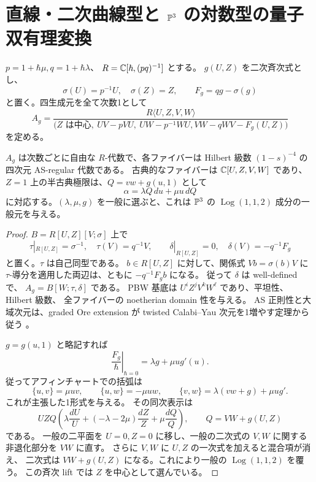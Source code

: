 \section{直線・二次曲線型と \texorpdfstring{$\mathbb P^3$}{P3} の対数型の量子双有理変換}
\label{sec:line-conic-quantum-link}\label{sec:line-conic-quantum}

$p=1+\hbar\mu,q=1+\hbar\lambda$、
$R=\mathbb C[\hbar,(pq)^{-1}]$ とする。
$g(U,Z)$ を二次斉次式とし、
\[
 \sigma(U)=p^{-1}U,\quad \sigma(Z)=Z,\qquad
 F_g=qg-\sigma(g)
\]
と置く。四生成元を全て次数1として
\begin{equation}\label{eq:ore-log112}
 A_g=\frac{R\langle U,Z,V,W\rangle}
 {\bigl(Z\text{ は中心},\ UV-pVU,\ UW-p^{-1}WU,
       VW-qWV-F_g(U,Z)\bigr)}
\end{equation}
を定める。

\begin{proposition}\label{prop:ore-log112}
$A_g$ は次数ごとに自由な $R$-代数で、各ファイバーは
Hilbert 級数 $(1-s)^{-4}$ の四次元 AS-regular 代数である。
古典的なファイバーは $\mathbb C[U,Z,V,W]$ であり、
$Z=1$ 上の半古典極限は、$Q=vw+g(u,1)$ として
\[
 \alpha=\lambda Q\,du+\mu u\,dQ
\]
に対応する。$(\lambda,\mu,g)$ を一般に選ぶと、これは $\mathbb P^3$ の
$\operatorname{Log}(1,1,2)$ 成分の一般元を与える。
\end{proposition}
\begin{proof}
$B=R[U,Z][V;\sigma]$ 上で
\[
 \tau|_{R[U,Z]}=\sigma^{-1},\quad \tau(V)=q^{-1}V,
 \qquad \delta|_{R[U,Z]}=0,\quad \delta(V)=-q^{-1}F_g
\]
と置く。$\tau$ は自己同型である。
$b\in R[U,Z]$ に対して、関係式 $Vb=\sigma(b)V$ に
$\tau$-導分を適用した両辺は、ともに $-q^{-1}F_gb$ になる。
従って $\delta$ は well-defined で、
$A_g=B[W;\tau,\delta]$ である。
PBW 基底は $U^iZ^jV^kW^\ell$ であり、平坦性、Hilbert 級数、
全ファイバーの noetherian domain 性を与える。
AS 正則性と大域次元は、graded Ore extension が
twisted Calabi--Yau 次元を1増やす定理から従う
\cite[定理0.2、\S1.2--1.3]{LiuWangWu}。

$g=g(u,1)$ と略記すれば
\[
 \left.\frac{F_g}{\hbar}\right|_{\hbar=0}
   =\lambda g+\mu u g'(u).
\]
従ってアフィンチャートでの括弧は
\[
 \{u,v\}=\mu uv,\qquad \{u,w\}=-\mu uw,\qquad
 \{v,w\}=\lambda(vw+g)+\mu u g'.
\]
これが主張した1形式を与える。
その同次表示は
\[
 UZQ\left(\lambda\frac{dU}{U}
    +(-\lambda-2\mu)\frac{dZ}{Z}
    +\mu\frac{dQ}{Q}\right),\qquad Q=VW+g(U,Z)
\]
である。
一般の二平面を $U=0,Z=0$ に移し、一般の二次式の
$V,W$ に関する非退化部分を $VW$ に直す。
さらに $V,W$ に $U,Z$ の一次式を加えると混合項が消え、
二次式は $VW+g(U,Z)$ になる。これにより一般の
$\operatorname{Log}(1,1,2)$ を覆う。
この斉次 lift では $Z$ を中心として選んでいる。
\end{proof}

